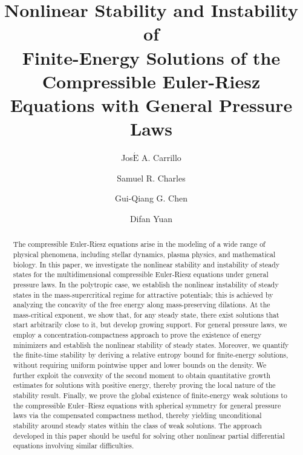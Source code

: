 \documentclass[reqno,11pt]{amsart}
\numberwithin{equation}{section}
\theoremstyle{definition}
\begin{document}
\title[Nonlinear Stability and Instability]{Nonlinear Stability and Instability of\\
Finite-Energy Solutions of the Compressible Euler-Riesz Equations with General Pressure Laws}

\author[J.A. Carrillo]{Jos$\acute{\mathrm{E}}$ A. Carrillo}
\address{J.A. Carrillo:\,Mathematical institute, University of Oxford, Oxford OX2 6GG, UK}

\author[S.R. Charles]{Samuel R. Charles}
\address{S.R. Charles:\, Department of Mathematics, National University of Singapore, Singapore 119076, Singapore}

\author[G.-Q. Chen]{Gui-Qiang G. Chen}
\address{Gui-Qiang G. Chen:\, Mathematical Institute, University of Oxford, Oxford OX2 6GG, UK;
School of Mathematical Sciences, Fudan University, Shanghai 200433, China;
AMSS, Chinese Academy of Sciences, Beijing 100190, China}

\author[D.~F. Yuan]{Difan Yuan}
\address{Difan Yuan: \,School of Mathematical Sciences,  Beijing Normal University and Laboratory of Mathematics and Complex Systems,
Ministry of Education, Beijing 100875, China}

\begin{abstract}
The compressible Euler-Riesz equations arise in the modeling of a wide range of physical phenomena, including stellar dynamics, plasma physics, and mathematical biology. In this paper, we investigate the nonlinear stability and 
instability of steady states for the multidimensional compressible Euler-Riesz equations 
under general pressure laws.
In the polytropic case, we establish the nonlinear instability of steady states 
in the mass-supercritical regime for attractive potentials; this is achieved by analyzing 
the concavity of the free energy along mass-preserving dilations. 
At the mass-critical exponent, we show that, for any steady state, there exist solutions that start arbitrarily 
close to it, but develop growing support. 
For general pressure laws, we employ a concentration-compactness approach to 
prove the existence of energy minimizers and establish the nonlinear stability of steady states. 
Moreover, we quantify the finite-time stability by deriving a relative entropy 
bound for finite-energy solutions, without requiring uniform pointwise upper and lower bounds on the density.
We further exploit the convexity of the second moment to obtain quantitative growth estimates for solutions with positive energy, thereby proving the local nature of the stability result. Finally, we prove the global existence of finite-energy weak solutions to the compressible Euler–Riesz equations with spherical symmetry for general pressure laws via the compensated compactness method, thereby yielding unconditional stability around steady states within the class of weak solutions. The approach developed in this paper should be useful for solving other nonlinear partial differential 
equations involving similar difficulties.
\end{abstract}
\end{document}
